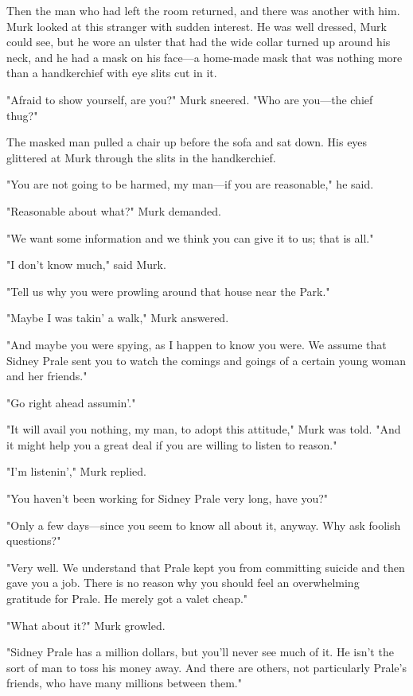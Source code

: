 \documentclass{novel}
\begin{document}
Then the man who had left the room returned, and there was another with him. Murk looked at this stranger with sudden interest. He was well dressed, Murk could see, but he wore an ulster that had the wide collar turned up around his neck, and he had a mask on his face---a home-made mask that was nothing more than a handkerchief with eye slits cut in it.

"Afraid to show yourself, are you?" Murk sneered. "Who are you---the chief thug?"

The masked man pulled a chair up before the sofa and sat down. His eyes glittered at Murk through the slits in the handkerchief.

"You are not going to be harmed, my man---if you are reasonable," he said.

"Reasonable about what?" Murk demanded.

"We want some information and we think you can give it to us; that is all."

"I don't know much," said Murk.

"Tell us why you were prowling around that house near the Park."

"Maybe I was takin' a walk," Murk answered.

"And maybe you were spying, as I happen to know you were. We assume that Sidney Prale sent you to watch the comings and goings of a certain young woman and her friends."

"Go right ahead assumin'."

"It will avail you nothing, my man, to adopt this attitude," Murk was told. "And it might help you a great deal if you are willing to listen to reason."

"I'm listenin'," Murk replied.

"You haven't been working for Sidney Prale very long, have you?"

"Only a few days---since you seem to know all about it, anyway. Why ask foolish questions?"

"Very well. We understand that Prale kept you from committing suicide and then gave you a job. There is no reason why you should feel an overwhelming gratitude for Prale. He merely got a valet cheap."

"What about it?" Murk growled.

"Sidney Prale has a million dollars, but you'll never see much of it. He isn't the sort of man to toss his money away. And there are others, not particularly Prale's friends, who have many millions between them."
\end{document}

